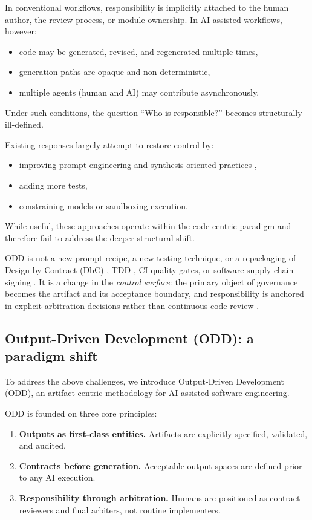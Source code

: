 \documentclass[conference]{IEEEtran}
\begin{document}
In conventional workflows, responsibility is implicitly attached to the human author, the review process, or module ownership. In AI-assisted workflows, however:
\begin{itemize}
\item code may be generated, revised, and regenerated multiple times,
\item generation paths are opaque and non-deterministic,
\item multiple agents (human and AI) may contribute asynchronously.
\end{itemize}

Under such conditions, the question ``Who is responsible?'' becomes structurally ill-defined.

Existing responses largely attempt to restore control by:
\begin{itemize}
\item improving prompt engineering and synthesis-oriented practices \cite{austin2021programsynthesis},
\item adding more tests,
\item constraining models or sandboxing execution.
\end{itemize}

While useful, these approaches operate within the code-centric paradigm and therefore fail to address the deeper structural shift.

ODD is not a new prompt recipe, a new testing technique, or a repackaging of Design by Contract (DbC) \cite{meyer1992dbc}, TDD \cite{beck2002tdd}, CI quality gates, or software supply-chain signing \cite{torresarias2019intoto, openssf2023slsa, newman2022sigstore}. It is a change in the \emph{control surface}: the primary object of governance becomes the artifact and its acceptance boundary, and responsibility is anchored in explicit arbitration decisions rather than continuous code review \cite{bacchelli2013codereview}.



\subsection{Output-Driven Development (ODD): a paradigm shift}
To address the above challenges, we introduce Output-Driven Development (ODD), an artifact-centric methodology for AI-assisted software engineering.

ODD is founded on three core principles:
\begin{enumerate}
\item \textbf{Outputs as first-class entities.} Artifacts are explicitly specified, validated, and audited.
\item \textbf{Contracts before generation.} Acceptable output spaces are defined prior to any AI execution.
\item \textbf{Responsibility through arbitration.} Humans are positioned as contract reviewers and final arbiters, not routine implementers.
\end{enumerate}
\end{document}
